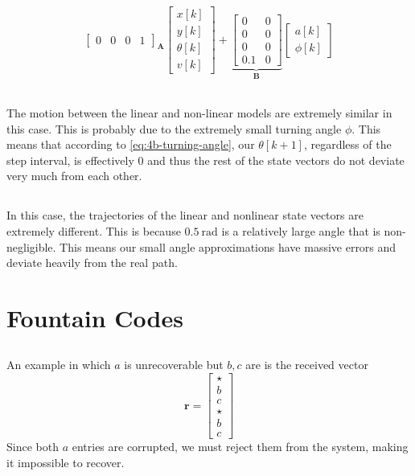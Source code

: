 \documentclass[]{article}
\begin{document}
\begin{align}
{\begin{bmatrix}
	0 & 0 & 0 & 1
	\end{bmatrix}}_{\mathbf{A}}
	\begin{bmatrix}
	x[k]\\
	y[k] \\
	\theta[k] \\
	v[k]
	\end{bmatrix}
	+
	\underbrace{\begin{bmatrix}
	0 & 0 \\
	0 & 0 \\
	0 & 0 \\
	0.1 & 0
	\end{bmatrix}}_{\mathbf{B}}
	\begin{bmatrix}
	a[k] \\
	\phi[k]
	\end{bmatrix}
\end{align}

\subsection{}

The motion between the linear and non-linear models are extremely similar in this case. This is probably due to the extremely small turning angle \(\phi\). This means that according to \autoref{eq:4b-turning-angle}, our \(\theta[k + 1]\), regardless of the step interval, is effectively \(0\) and thus the rest of the state vectors do not deviate very much from each other. 

\subsection{}

In this case, the trajectories of the linear and nonlinear state vectors are extremely different. This is because \(0.5 \ \text{rad}\) is a relatively large angle that is non-negligible. This means our small angle approximations have massive errors and deviate heavily from the real path. 

\section{Fountain Codes}

\subsection{}

An example in which \(a\) is unrecoverable but \(b, c\) are is the received vector
\begin{equation}
	\mathbf{r} = 
	\begin{bmatrix}
	\star \\
	b \\
	c \\
	\star \\
	b \\
	c
	\end{bmatrix}
\end{equation}
Since both \(a\) entries are corrupted, we must reject them from the system, making it impossible to recover. 
\end{document}
